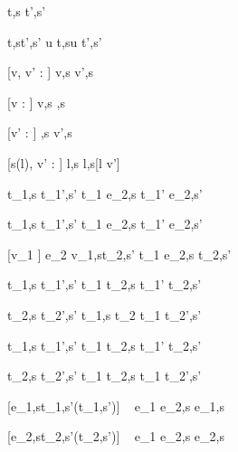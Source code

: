 




  {t,s  t',s'}

  {t,st',s'}
  {u \At t,su \At t',s'}

[v, v' : \tau]
  { }
  {\Edit v,s  \Edit v',s}

[v : \tau]
  { }
  {\Edit v,s \handle{\Empty} \Enter \tau,s}

[v' : \tau]
  { }
  {\Enter \tau,s  \Edit v',s}

[s(l), v' : \tau]
  { }
  {\Update l,s  \Update l,s[l \mapsto v']{}}


  {t_1,s  t_1',s'}
  {t_1 \Then e_2,s  t_1' \Then e_2,s'}

  {t_1,s  t_1',s'}
  {t_1 \Next e_2,s  t_1' \Next e_2,s'}

[\equiv v_1 \wedge \neg{}]
  {e_2 v_1,s\normalise t_2,s'}
  {t_1 \Next e_2,s \handle{\Continue} t_2,s'}


  {t_1,s  t_1',s' }
  {t_1 \And t_2,s  t_1' \And t_2,s'}

  {t_2,s  t_2',s'}
  {t_1,s \And t_2  t_1 \And t_2',s'}


  {t_1,s  t_1',s'}
  {t_1 \Or t_2,s  t_1' \Or t_2,s'}

  {t_2,s  t_2',s' }
  {t_1 \Or t_2,s  t_1 \Or t_2',s'}


[e_1,s\evaluate t_1,s'\wedge \neg\Failing(t_1,s')]
  {\ }
  {e_1 \Xor e_2,s \handle{\Left} e_1,s}

[e_2,s\evaluate t_2,s'\wedge \neg\Failing(t_2,s')]
  {\ }
  {e_1 \Xor e_2,s \handle{\Right} e_2,s}






